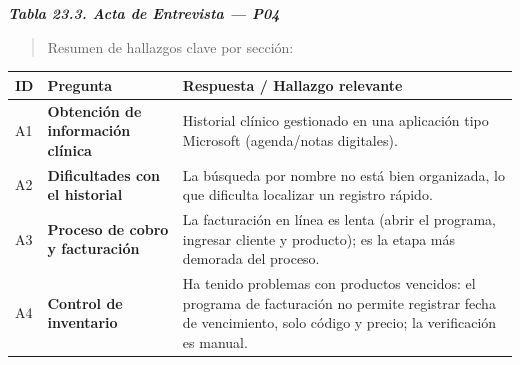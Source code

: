 \documentclass[
]{article}
\newcounter{none} %
\begin{document}
\protect{}\label{_bookmark_P04_acta}{}\emph{\textbf{Tabla 23.3. Acta de Entrevista --- P04}}

\begin{quote}
Resumen de hallazgos clave por sección:
\end{quote}

{\def\LTcaptype{none} %
\begin{longtable}[]{|
  >{\centering\arraybackslash}p{}|
  >{\raggedright\arraybackslash}p{}|
  >{\raggedright\arraybackslash}p{}|}
\hline
\begin{minipage}[b]{\linewidth}\centering
\textbf{ID}
\end{minipage} & \begin{minipage}[b]{\linewidth}\centering
\textbf{Pregunta}
\end{minipage} & \begin{minipage}[b]{\linewidth}\raggedright
\textbf{Respuesta / Hallazgo relevante}
\end{minipage} \\
\hline
\endhead
\hline
\endlastfoot
A1 & \textbf{Obtención de información clínica} &
\begin{minipage}[t]{\linewidth}\raggedright
Historial clínico gestionado en una aplicación tipo Microsoft (agenda/notas digitales).
\end{minipage} \\
\hline
A2 & \textbf{Dificultades con el historial} &
\begin{minipage}[t]{\linewidth}\raggedright
La búsqueda por nombre no está bien organizada, lo que dificulta localizar un registro rápido.
\end{minipage} \\
\hline
A3 & \textbf{Proceso de cobro y facturación} &
\begin{minipage}[t]{\linewidth}\raggedright
La facturación en línea es lenta (abrir el programa, ingresar cliente y producto); es la etapa más demorada del proceso.
\end{minipage} \\
\hline
A4 & \textbf{Control de inventario} &
\begin{minipage}[t]{\linewidth}\raggedright
Ha tenido problemas con productos vencidos: el programa de facturación no permite registrar fecha de vencimiento, solo código y precio; la verificación es manual.
\end{minipage} \\

\end{longtable}}
\end{document}

